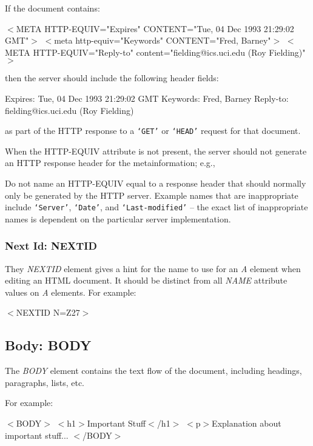 If the document contains:
\par $<$META HTTP-EQUIV="Expires"
      CONTENT="Tue, 04 Dec 1993 21:29:02 GMT"$>$
$<$meta http-equiv="Keywords" CONTENT="Fred, Barney"$>$
$<$META HTTP-EQUIV="Reply-to"
      content="fielding@ics.uci.edu (Roy Fielding)"$>$
\par 
then the server should include the following header fields:
\par Expires: Tue, 04 Dec 1993 21:29:02 GMT
Keywords: Fred, Barney
Reply-to: fielding@ics.uci.edu (Roy Fielding)
\par 
as part of the HTTP response to a {\tt `GET'} or {\tt `HEAD'} request
for that document.
\par \par 
When the HTTP-EQUIV attribute is not present, the server should not
generate an HTTP response header for the metainformation;  e.g.,
\par \par 
Do not name an HTTP-EQUIV equal to a response header that should
normally only be generated by the HTTP server.  Example names that are
inappropriate include {\tt `Server'}, {\tt `Date'}, and
{\tt `Last-modified'} -- the exact list of inappropriate names is
dependent on the particular server implementation.
\par \subsubsection*{Next Id:  NEXTID}\par 
They {\it NEXTID} element gives a hint for the name to use for an
{\it A} element when editing an HTML document.  It should be distinct
from all {\it NAME} attribute values on {\it A} elements.  For
example:
\par $<$NEXTID N=Z27$>$
\subsection*{Body:  BODY}\par 
The {\it BODY} element contains the text flow of the document,
including headings, paragraphs, lists, etc.
\par \par 
For example:
\par $<$BODY$>$
$<$h1$>$Important Stuff$<$/h1$>$
$<$p$>$Explanation about important stuff...
$<$/BODY$>$
